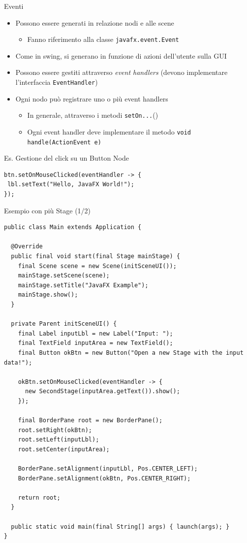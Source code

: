 \documentclass[presentation]{beamer}
\begin{document}
\begin{frame}[fragile]{Eventi}
\begin{itemize}\itemsep10pt
\item Possono essere generati in relazione nodi e alle scene
\begin{itemize}
\item Fanno riferimento alla classe \texttt{javafx.event.Event}
\end{itemize}
\item Come in swing, si generano in funzione di azioni dell'utente sulla GUI
\item Possono essere gestiti attraverso \emph{event handlers} (devono implementare l'interfaccia \texttt{EventHandler})
\item Ogni nodo può registrare uno o più event handlers
\begin{itemize}
\item In generale, attraverso i metodi \texttt{setOn...}()
\item Ogni event handler deve implementare il metodo \texttt{void handle(ActionEvent e)}
\end{itemize}
\end{itemize}

\begin{block}{Es. Gestione del click su un Button Node}
\begin{lstlisting}
btn.setOnMouseClicked(eventHandler -> {
 lbl.setText("Hello, JavaFX World!");
});
\end{lstlisting}
\end{block}
\end{frame}

\begin{frame}[fragile]{Esempio con più Stage (1/2)}
\begin{lstlisting}[basicstyle=\tiny]
public class Main extends Application {

  @Override
  public final void start(final Stage mainStage) {
    final Scene scene = new Scene(initSceneUI());
    mainStage.setScene(scene);
    mainStage.setTitle("JavaFX Example");
    mainStage.show();
  }

  private Parent initSceneUI() {
    final Label inputLbl = new Label("Input: ");
    final TextField inputArea = new TextField();
    final Button okBtn = new Button("Open a new Stage with the input data!");
       
    okBtn.setOnMouseClicked(eventHandler -> {
      new SecondStage(inputArea.getText()).show();
    });

    final BorderPane root = new BorderPane();
    root.setRight(okBtn);
    root.setLeft(inputLbl);
    root.setCenter(inputArea);

    BorderPane.setAlignment(inputLbl, Pos.CENTER_LEFT);
    BorderPane.setAlignment(okBtn, Pos.CENTER_RIGHT);

    return root;
  }

  public static void main(final String[] args) { launch(args); }
}
\end{lstlisting}
\end{frame}
\end{document}
